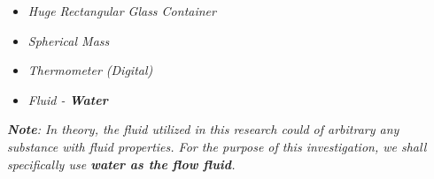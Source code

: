 \begin{itemize}
    \item \textit{Huge Rectangular Glass Container}
    \item \textit{Spherical Mass}
    \item \textit{Thermometer (Digital)}
    \item \textit{Fluid - \textbf{Water}}
    \label{mat}
\end{itemize}

\textit{\textbf{Note}: In theory, the fluid utilized in this research could of arbitrary any substance with fluid properties. For the purpose of this investigation, we shall specifically use \textbf{water as the flow fluid}.}


